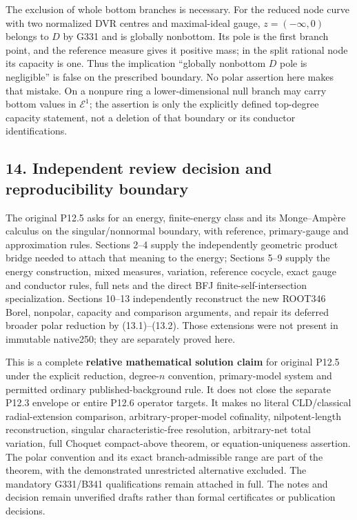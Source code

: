 \documentclass[
]{article}
\begin{document}
The exclusion of whole bottom branches is necessary. For the reduced
node curve with two normalized DVR centres and maximal-ideal gauge,
\(z=(-\infty,0)\) belongs to \(D\) by G331 and is globally nonbottom.
Its pole is the first branch point, and the reference measure gives it
positive mass; in the split rational node its capacity is one. Thus the
implication ``globally nonbottom \(D\) pole is negligible'' is false on
the prescribed boundary. No polar assertion here makes that mistake. On
a nonpure ring a lower-dimensional null branch may carry bottom values
in \(\mathcal E^1\); the assertion is only the explicitly defined
top-degree capacity statement, not a deletion of that boundary or its
conductor identifications.

\subsection{14. Independent review decision and reproducibility
boundary}\label{independent-review-decision-and-reproducibility-boundary}

The original P12.5 asks for an energy, finite-energy class and its
Monge--Ampère calculus on the singular/nonnormal boundary, with
reference, primary-gauge and approximation rules. Sections 2--4 supply
the independently geometric product bridge needed to attach that meaning
to the energy; Sections 5--9 supply the energy construction, mixed
measures, variation, reference cocycle, exact gauge and conductor rules,
full nets and the direct BFJ finite-self-intersection specialization.
Sections 10--13 independently reconstruct the new ROOT346 Borel,
nonpolar, capacity and comparison arguments, and repair its deferred
broader polar reduction by (13.1)--(13.2). Those extensions were not
present in immutable native250; they are separately proved here.

This is a complete \textbf{relative mathematical solution claim} for
original P12.5 under the explicit reduction, degree-\(n\) convention,
primary-model system and permitted ordinary published-background rule.
It does not close the separate P12.3 envelope or entire P12.6 operator
targets. It makes no literal CLD/classical radial-extension comparison,
arbitrary-proper-model cofinality, nilpotent-length reconstruction,
singular characteristic-free resolution, arbitrary-net total variation,
full Choquet compact-above theorem, or equation-uniqueness assertion.
The polar convention and its exact branch-admissible range are part of
the theorem, with the demonstrated unrestricted alternative excluded.
The mandatory G331/B341 qualifications remain attached in full. The
notes and decision remain unverified drafts rather than formal
certificates or publication decisions.
\end{document}
